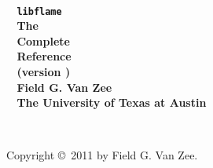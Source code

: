 \pagestyle{headings}


%
%
%
%
%
%
%
%
%

~
\vspace{1.5in}
\\
\noindent
{
\bf
\Huge
\mbox{~} \hfill {\tt libflame} \\[0.3in]
\LARGE
\mbox{~} \hfill The \\[0.255in] %
\LARGE
\mbox{~} \hfill Complete \\[0.20in]
\LARGE
\mbox{~} \hfill Reference \\[0.235in]
\LARGE
\mbox{~} \hfill (version ) \\[0.60in]
\noindent
\LARGE
\mbox{~} \hfill Field G. Van Zee \\[0.1in]
\LARGE
\mbox{~} \hfill \rm The University of Texas at Austin%
}

\pagestyle{empty}

\newpage

~
\vspace{3.4in}

\noindent
Copyright \copyright\ 2011 by Field G. Van Zee.
\vspace{0.2in}

